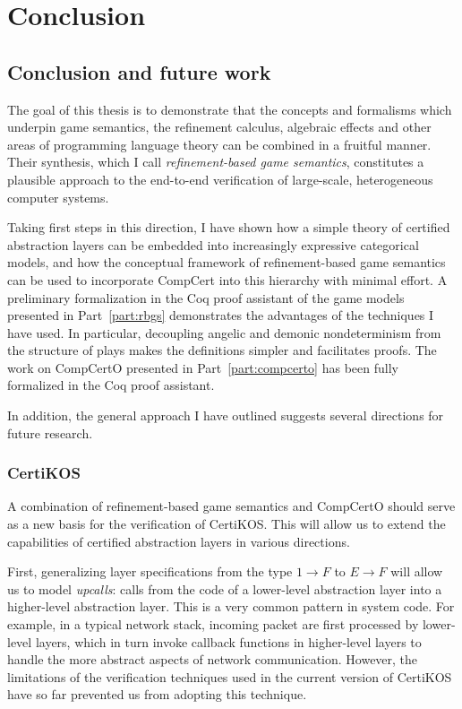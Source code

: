 \documentclass[11pt,oneside]{book}
\theoremstyle{definition}
\begin{document}



\part{Conclusion}

\chapter{Conclusion and future work} %

The goal of this thesis is to demonstrate that
the concepts and formalisms which underpin
game semantics,
the refinement calculus,
algebraic effects and
other areas of programming language theory
can be combined in a fruitful manner.
Their synthesis,
which I call \emph{refinement-based game semantics},
constitutes
a plausible approach to the end-to-end verification
of large-scale, heterogeneous computer systems.

Taking first steps in this direction,
I have shown how a simple theory of certified abstraction layers
can be embedded into increasingly expressive categorical models,
and how the conceptual framework of refinement-based game semantics
can be used to incorporate CompCert into this hierarchy
with minimal effort.
A preliminary formalization in the Coq proof assistant
of the game models presented in Part~\ref{part:rbgs}
demonstrates the advantages of the techniques I have used.
In particular,
decoupling angelic and demonic nondeterminism
from the structure of plays
makes the definitions simpler and facilitates proofs.
The work on CompCertO presented in Part~\ref{part:compcerto}
has been fully formalized in the Coq proof assistant.

In addition,
the general approach I have outlined
suggests several directions for future research.

\section{CertiKOS} %

A combination of refinement-based game semantics
and CompCertO
should serve as a new basis
for the verification of CertiKOS.
This will allow us to extend the capabilities
of certified abstraction layers
in various directions.

First,
generalizing layer specifications
from the type $1 \rightarrow F$ to $E \rightarrow F$
will allow us to model \emph{upcalls}:
calls from the code of a lower-level abstraction layer
into a higher-level abstraction layer.
This is a very common pattern in system code.
For example,
in a typical network stack,
incoming packet are first processed by
lower-level layers,
which in turn invoke callback functions in
higher-level layers
to handle the more abstract aspects of
network communication.
However,
the limitations of the verification techniques
used in the current version of CertiKOS
have so far prevented us from adopting this technique.
\end{document}
